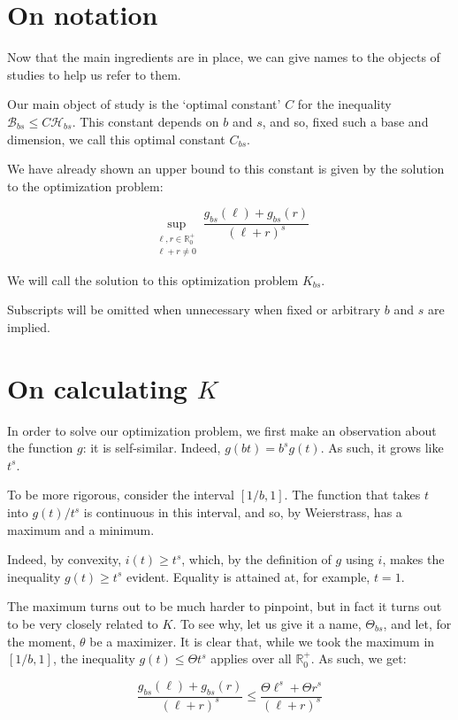 \documentclass[11pt]{amsart}
\newcommand{\R}{\mathbb{R}}
\newcommand{\HH}{\mathcal{H}}
\newcommand{\BB}{\mathcal{B}}
\begin{document}
\section{On notation}

Now that the main ingredients are in place, we can give names to the objects of studies to help us refer to them.

Our main object of study is the `optimal constant' $C$ for the inequality $\BB_{bs} \leq C \HH_{bs}$. This constant depends on $b$ and $s$, and so, fixed such a base and dimension, we call this optimal constant $C_{bs}$.

We have already shown an upper bound to this constant is given by the solution to the optimization problem:

\[ \sup_{\substack{\ell,r \in \R^+_0\\\ell+r \neq 0}} \frac{g_{bs}(\ell) + g_{bs}(r)}{(\ell + r)^s} \]

We will call the solution to this optimization problem $K_{bs}$.

Subscripts will be omitted when unnecessary when fixed or arbitrary $b$ and $s$ are implied.

\section{On calculating $K$} \label{calck}

In order to solve our optimization problem, we first make an observation about the function $g$: it is self-similar. Indeed, $g(b t) = b^s g(t)$. As such, it grows like $t^s$.

To be more rigorous, consider the interval $\left[ 1/b, 1 \right]$. The function that takes $t$ into $g(t)/t^s$ is continuous in this interval, and so, by Weierstrass, has a maximum and a minimum.

Indeed, by convexity, $i(t) \geq t^s$, which, by the definition of $g$ using $i$, makes the inequality $g(t) \geq t^s$ evident. Equality is attained at, for example, $t = 1$.

The maximum turns out to be much harder to pinpoint, but in fact it turns out to be very closely related to $K$. To see why, let us give it a name, $\Theta_{bs}$, and let, for the moment, $\theta$ be a maximizer. It is clear that, while we took the maximum in $\left[ 1/b, 1 \right]$, the inequality $g(t) \leq \Theta t^s$ applies over all $\R^+_0$. As such, we get:

\[\frac{g_{bs}(\ell) + g_{bs}(r)}{(\ell + r)^s} \leq \frac{\Theta \ell^s + \Theta r^s}{(\ell+r)^s}\]
\end{document}
